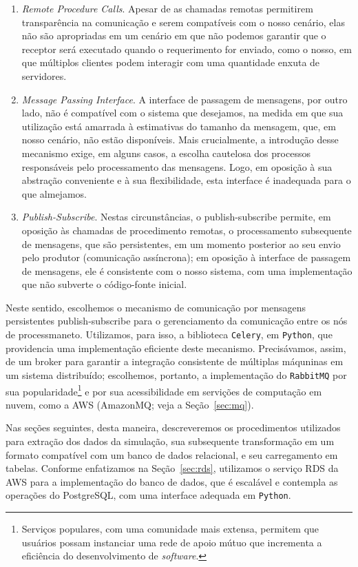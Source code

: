 \documentclass[12pt,oneside,a4paper]{article}
\begin{document}
	\begin{enumerate} 
		\item \textit{Remote Procedure Calls}. Apesar de as chamadas remotas permitirem transparência na comunicação e serem compatíveis com o nosso cenário, elas não são apropriadas em um cenário em que não podemos garantir que o receptor será executado quando o requerimento for enviado, como o nosso, em que múltiplos clientes podem interagir com uma quantidade enxuta de servidores. 
		\item \textit{Message Passing Interface}. A interface de passagem de mensagens, por outro lado, não é compatível com o sistema que desejamos, na medida em que sua utilização está amarrada à estimativas do tamanho da mensagem, que, em nosso cenário, não estão disponíveis. Mais crucialmente, a introdução desse mecanismo exige, em alguns casos, a escolha cautelosa dos processos responsáveis pelo processamento das mensagens. Logo, em oposição à sua abstração conveniente e à sua flexibilidade, esta interface é inadequada para o que almejamos. 
		\item \textit{Publish-Subscribe}. Nestas circunstâncias, o publish-subscribe permite, em oposição às chamadas de procedimento remotas, o processamento subsequente de mensagens, que são persistentes, em um momento posterior ao seu envio pelo produtor (comunicação assíncrona); em oposição à interface de passagem de mensagens, ele é consistente com o nosso sistema, com uma implementação que não subverte o código-fonte inicial. 
	\end{enumerate} 

	\noindent Neste sentido, escolhemos o mecanismo de comunicação por mensagens persistentes publish-subscribe para o gerenciamento da comunicação entre os nós de processmaneto. Utilizamos, para isso, a biblioteca \texttt{Celery}, em \texttt{Python}, que providencia uma implementação eficiente deste mecanismo. Precisávamos, assim, de um broker para garantir a integração consistente de múltiplas máquninas em um sistema distribuído; escolhemos, portanto, a implementação do \texttt{RabbitMQ} por sua popularidade\footnote{Serviços populares, com uma comunidade mais extensa, permitem que usuários possam instanciar uma rede de apoio mútuo que incrementa a eficiência do desenvolvimento de \textit{software}.} e por sua acessibilidade em servições de computação em nuvem, como a AWS (AmazonMQ; veja a Seção~\ref{sec:mq}). 

	
	Nas seções seguintes, desta maneira, descreveremos os procedimentos utilizados para extração dos dados da simulação, sua subsequente transformação em um formato compatível com um banco de dados relacional, e seu carregamento em tabelas. Conforme enfatizamos na Seção~\ref{sec:rds}, utilizamos o serviço RDS da AWS para a implementação do banco de dados, que é escalável e contempla as operações do PostgreSQL, com uma interface adequada em \texttt{Python}. 
\end{document}
